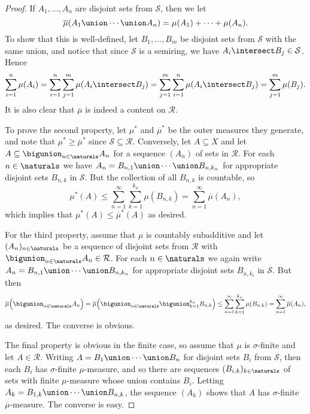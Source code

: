 \documentclass[article, a4paper, 11pt, oneside]{memoir}
\numberwithin{equation}{chapter}
\newcommand{\calR}{\mathcal{R}}
\newcommand{\calS}{\mathcal{S}}
\begin{document}
\begin{proof}
    If $A_1, \ldots, A_n$ are disjoint sets from $\calS$, then we let
    \begin{equation*}
        \overline{\mu}(A_1 \union \cdots \union A_n)
            = \mu(A_1) + \cdots + \mu(A_n).
    \end{equation*}
    To show that this is well-defined, let $B_1, \ldots, B_m$ be disjoint sets from $\calS$ with the same union, and notice that since $\calS$ is a semiring, we have $A_i \intersect B_j \in \calS$. Hence
    \begin{equation*}
        \sum_{i=1}^n \mu(A_i)
            = \sum_{i=1}^n \sum_{j=1}^m \mu(A_i \intersect B_j)
            = \sum_{j=1}^m \sum_{i=1}^n \mu(A_i \intersect B_j)
            = \sum_{j=1}^m \mu(B_j).
    \end{equation*}
    It is also clear that $\overline{\mu}$ is indeed a content on $\calR$.

    To prove the second property, let $\mu^*$ and $\overline{\mu}^*$ be the outer measures they generate, and note that $\mu^* \geq \overline{\mu}^*$ since $\calS \subseteq \calR$. Conversely, let $A \subseteq X$ and let $A \subseteq \bigunion_{n \in \naturals} A_n$ for a sequence $(A_n)$ of sets in $\calR$. For each $n \in \naturals$ we have $A_n = B_{n,1} \union \cdots \union B_{n,k_n}$ for appropriate disjoint sets $B_{n,k}$ in $\calS$. But the collection of all $B_{n,k}$ is countable, so
    \begin{equation*}
        \mu^*(A)
            \leq \sum_{n=1}^\infty \sum_{k=1}^{k_n} \mu(B_{n,k})
            = \sum_{n=1}^\infty \overline{\mu}(A_n),
    \end{equation*}
    which implies that $\mu^*(A) \leq \overline{\mu}^*(A)$ as desired.

    For the third property, assume that $\mu$ is countably subadditive and let $(A_n)_{n \in \naturals}$ be a sequence of disjoint sets from $\calR$ with $\bigunion_{n \in \naturals} A_n \in \calR$. For each $n \in \naturals$ we again write $A_n = B_{n,1} \union \cdots \union B_{n,k_n}$ for appropriate disjoint sets $B_{n,k_i}$ in $\calS$. But then
    \begin{equation*}
        \overline{\mu} \Bigl( \bigunion_{n \in \naturals} A_n \Bigr)
            = \overline{\mu} \Bigl( \bigunion_{n \in \naturals} \bigunion_{k=1}^{k_n} B_{n,k} \Bigr)
            \leq \sum_{n=1}^\infty \sum_{k=1}^{k_n} \mu(B_{n,k})
            = \sum_{n=1}^\infty \overline{\mu}(A_n),
    \end{equation*}
    as desired. The converse is obvious.

    The final property is obvious in the finite case, so assume that $\mu$ is $\sigma$-finite and let $A \in \calR$. Writing $A = B_1 \union \cdots \union B_n$ for disjoint sets $B_i$ from $\calS$, then each $B_i$ has $\sigma$-finite $\mu$-measure, and so there are sequences $(B_{i,k})_{k \in \naturals}$ of sets with finite $\mu$-measure whose union contains $B_i$. Letting $A_k = B_{1,k} \union \cdots \union B_{n,k}$, the sequence $(A_k)$ shows that $A$ has $\sigma$-finite $\overline{\mu}$-measure. The converse is easy.
\end{proof}
\end{document}
